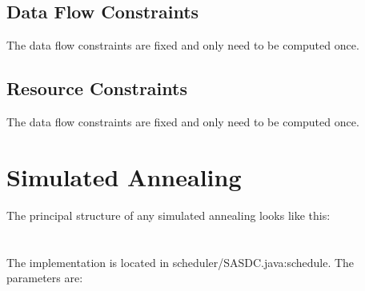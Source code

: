 \documentclass[colorback,accentcolor=tud1c,11pt]{tudreport}
\begin{document}
  \section{Data Flow Constraints}
  The data flow constraints are fixed and only need to be computed once. \\
  
  \section{Resource Constraints}
  The data flow constraints are fixed and only need to be computed once. \\
  



  \chapter{Simulated Annealing}
  The principal structure of any simulated annealing looks like this:\\
  \\ \\
  The implementation is located in scheduler/SASDC.java:schedule. The parameters are:
\end{document}

